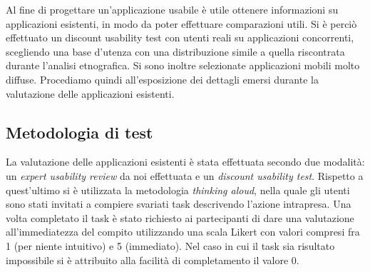 Al fine di progettare un'applicazione usabile è utile ottenere informazioni su applicazioni
esistenti, in modo da poter effettuare comparazioni utili. Si è perciò effettuato un discount usability
test con utenti reali su applicazioni concorrenti, scegliendo una base d'utenza con una distribuzione simile
a quella riscontrata durante l'analisi etnografica. Si sono inoltre selezionate applicazioni mobili molto diffuse.
Procediamo quindi all'esposizione dei dettagli emersi durante la valutazione delle applicazioni esistenti.

\subsection{Metodologia di test}
La valutazione delle applicazioni esistenti è stata effettuata secondo due
modalità: un \emph{expert usability review} da noi effettuata e un
\emph{discount usability test}.  Rispetto a quest'ultimo si è utilizzata la
metodologia \emph{thinking aloud}, nella quale gli utenti sono stati invitati a
compiere svariati task descrivendo l'azione intrapresa.  Una volta completato il
task è stato richiesto ai partecipanti di dare una valutazione all'immediatezza
del compito utilizzando una scala Likert con valori compresi fra 1 (per niente
intuitivo) e 5 (immediato).  Nel caso in cui il task sia risultato impossibile
si è attribuito alla facilità di completamento il valore 0.

